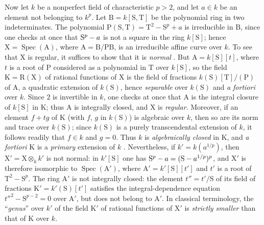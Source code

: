 \begin{remarks}[6.7.5]
Now let $k$ be a nonperfect field of characteristic $p>2$, and let $a\in k$ be an element not belonging to $k^p$. Let $\mathrm{B}=k[\mathrm{S},\mathrm{T}]$ be the polynomial ring in two indeterminates. The polynomial $\mathrm{P}(\mathrm{S},\mathrm{T})=\mathrm{T}^2-\mathrm{S}^p+a$
is irreducible in $\mathrm{B}$, since one checks at once that $\mathrm{S}^p- a$ is not a square in the ring $k[\mathrm{S}]$; hence $\mathrm{X}=\operatorname{Spec}(\mathrm{A})$, where $\mathrm{A}=\mathrm{B}/\mathrm{PB}$, is an irreducible affine curve over $k$. To see that $\mathrm{X}$ is regular, it suffices to show that it is \emph{normal} . But $\mathrm{A}=k[\mathrm{S}][t]$, where $t$ is a root of $\mathrm{P}$ considered as a polynomial in $\mathrm{T}$ over $k[\mathrm{S}]$, so the field $\mathrm{K}=\mathrm{R}(\mathrm{X})$ of rational functions of $\mathrm{X}$ is the field of fractions $k(\mathrm{S})[\mathrm{T}]/(\mathrm{P})$ of $\mathrm{A}$, a quadratic extension of $k(\mathrm{S})$, hence \emph{separable} over $k(\mathrm{S})$ and \emph{a fortiori} over $k$. Since $2$ is invertible in $k$, one checks at once that $\mathrm{A}$ is the integral closure of $k[\mathrm{S}]$ in $\mathrm{K}$; thus $\mathrm{A}$ is integrally closed, and $\mathrm{X}$ is \emph{regular}. Moreover, if an element $f+tg$ of $\mathrm{K}$ (with $f$, $g$ in $k(\mathrm{S})$) is algebraic over $k$, then so are its norm and trace over $k(\mathrm{S})$; since $k(\mathrm{S})$ is a purely transcendental extension of $k$, it follows readily that $f\in k$ and $g=0$. Thus $k$ is \emph{algebraically closed} in $\mathrm{K}$, and \emph{a fortiori} $\mathrm{K}$ is a \emph{primary} extension
of $k$ . Nevertheless, if $k'=k(a^{1/p})$, then $\mathrm{X}'=\mathrm{X}\otimes_k k'$ is not normal: in $k'[\mathrm{S}]$ one has $\mathrm{S}^p-a=(\mathrm{S}- a^{1/p})^p$,
and $\mathrm{X}'$ is therefore isomorphic to $\operatorname{Spec}(\mathrm{A}')$, where $\mathrm{A}'=k'[\mathrm{S}][t']$ and $t'$ is a root of $\mathrm{T}^2-\mathrm{S}^p$. The ring $\mathrm{A}'$ is not integrally closed: the element $t''=t'/\mathrm{S}$ of its field of fractions $\mathrm{K}'=k'(\mathrm{S})[t']$ satisfies the integral-dependence equation $t''^2-\mathrm{S}^{p-2}=0$
over $\mathrm{A}'$, but does not belong to $\mathrm{A}'$. In classical terminology, the ``\emph{genus}'' over $k'$ of the field $\mathrm{K}'$ of rational functions of $\mathrm{X}'$ is \emph{strictly smaller} than that of $\mathrm{K}$ over $k$.


\end{remarks}
